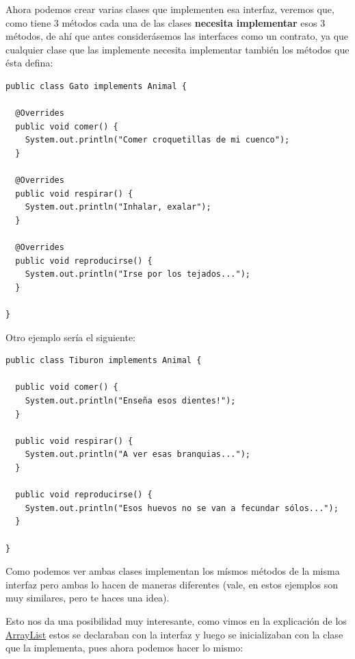 \documentclass[11pt]{article}
\begin{document}
Ahora podemos crear varias clases que implementen esa interfaz, veremos que, como tiene 3 métodos cada una de las clases \textbf{necesita implementar} esos 3 métodos, de ahí que antes considerásemos las interfaces como un contrato, ya que cualquier clase que las implemente necesita implementar también los métodos que ésta defina:

\begin{verbatim}
public class Gato implements Animal {

  @Overrides
  public void comer() {
    System.out.println("Comer croquetillas de mi cuenco");
  }

  @Overrides
  public void respirar() {
    System.out.println("Inhalar, exalar");
  }

  @Overrides
  public void reproducirse() {
    System.out.println("Irse por los tejados...");
  }

}
\end{verbatim}

Otro ejemplo sería el siguiente:

\begin{verbatim}
public class Tiburon implements Animal {

  public void comer() {
    System.out.println("Enseña esos dientes!");
  }

  public void respirar() {
    System.out.println("A ver esas branquias...");
  }

  public void reproducirse() {
    System.out.println("Esos huevos no se van a fecundar sólos...");
  }

}
\end{verbatim}

Como podemos ver ambas clases implementan los mísmos métodos de la misma interfaz pero ambas lo hacen de maneras diferentes (vale, en estos ejemplos son muy similares, pero te haces una idea).

Esto nos da una posibilidad muy interesante, como vimos en la explicación de los \hyperref[orgf1ca7f3]{ArrayList} estos se declaraban con la interfaz y luego se inicializaban con la clase que la implementa, pues ahora podemos hacer lo mismo:
\end{document}
